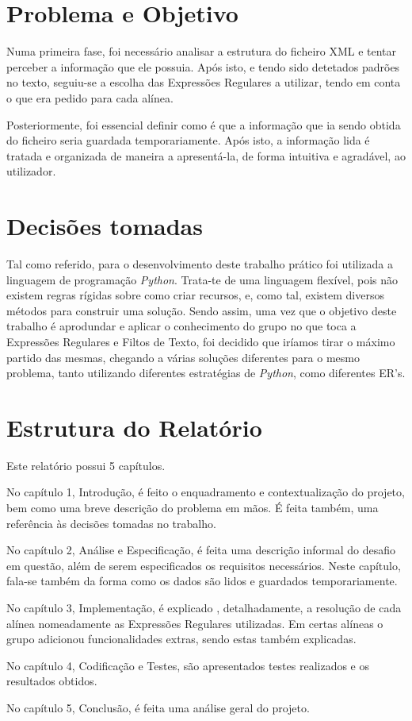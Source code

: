 \documentclass[11pt,a4paper]{report}
\begin{document}
\section{Problema e Objetivo}

	\qquad Numa primeira fase, foi necessário analisar a estrutura do ficheiro XML e tentar perceber a informação que ele possuia. Após isto, e tendo sido detetados padrões no texto, seguiu-se a escolha das Expressões Regulares a utilizar, tendo em conta o que era pedido para cada alínea.\par
	\qquad Posteriormente, foi essencial definir como é que a informação que ia sendo obtida do ficheiro seria guardada temporariamente. Após isto, a informação lida é tratada e organizada de maneira a apresentá-la, de forma intuitiva e agradável, ao utilizador.


\section{Decisões tomadas}

	\qquad Tal como referido, para o desenvolvimento deste trabalho prático foi utilizada a linguagem de programação \textit{Python}. Trata-te de uma linguagem flexível, pois não existem regras rígidas sobre como criar recursos, e, como tal, existem diversos métodos para construir uma solução. Sendo assim, uma vez que o objetivo deste trabalho é aprodundar e aplicar o conhecimento do grupo no que toca a Expressões Regulares e Filtos de Texto, foi decidido que iríamos tirar o máximo partido das mesmas, chegando a várias soluções diferentes para o mesmo problema, tanto utilizando diferentes estratégias de \textit{Python}, como diferentes ER's.



\section{Estrutura do Relatório}

	  \qquad Este relatório possui 5 capítulos. \par
	  \qquad No capítulo 1, Introdução, é feito o enquadramento e contextualização do projeto, bem como uma breve descrição do problema em mãos. É feita também, uma referência às decisões tomadas no trabalho.\par
	  \qquad No capítulo 2, Análise  e Especificação, é feita uma descrição informal do desafio em questão, além de serem especificados os requisitos necessários. Neste capítulo, fala-se também da forma como os dados são lidos e guardados temporariamente.\par
	 \qquad  No capítulo 3, Implementação, é explicado , detalhadamente, a resolução de cada alínea nomeadamente as Expressões Regulares utilizadas. Em certas alíneas o grupo adicionou funcionalidades extras, sendo estas também explicadas.\par
	  \qquad No capítulo 4, Codificação e Testes, são apresentados testes realizados e os resultados obtidos.\par
	  \qquad No capítulo 5, Conclusão, é feita uma análise geral do projeto.\par
\end{document}
